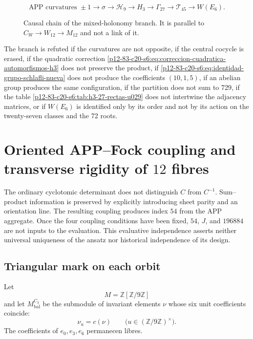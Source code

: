\begin{figure}[htbp]
\centering
\[
 \text{APP curvatures }\pm1
 \longrightarrow\sigma
 \longrightarrow\mathcal H_9
 \longrightarrow H_3
 \longrightarrow\Gamma_{27}
 \longrightarrow\mathcal T_{45}
 \longrightarrow W(E_6).
\]
\caption{Causal chain of the mixed-holonomy branch. It is parallel to
\(C_W\to W_{12}\to M_{12}\) and not a link of it.}
\label{p12-83-c20-s6:fig:cadena-holonomia-e6-u029}
\end{figure}

\begin{criterion}
\label{p12-83-c20-s6:crit:refutacion-rama-e6-u029}
The branch is refuted if the curvatures are not opposite, if the central cocycle is erased, if the quadratic correction \eqref{p12-83-c20-s6:eq:correccion-cuadratica-automorfismos-h3} does not preserve the product, if \eqref{p12-83-c20-s6:eq:identidad-grupo-schlafli-nueva} does not produce the coefficients \((10,1,5)\), if an abelian group produces the same configuration, if the partition does not sum to 729, if the table \ref{p12-83-c20-s6:tab:h3-27-rectas-u029} does not intertwine the adjacency matrices, or if \(W(E_6)\) is identified only by its order and not by its action on the twenty-seven classes and the 72 roots.
\end{criterion}


\section{Oriented APP–Fock coupling and transverse rigidity of \(12\) fibres}
\label{p12-83-c20-s7:chap:acoplamiento-app-fock}

The ordinary cyclotomic determinant does not distinguish \(C\) from \(C^{-1}\).
Sum--product information is preserved by explicitly introducing
sheet parity and an orientation line. The resulting coupling
produces index \(54\) from the APP aggregate. Once the four
coupling conditions have been fixed, \(54\), \(J\), and \(196884\) are not inputs to
the evaluation. This evaluative independence asserts neither universal uniqueness
of the ansatz nor historical independence of its design.

\subsection{Triangular mark on each orbit}

Let
\[
M=\mathbb Z[\mathbb Z/9\mathbb Z]
\]
and let \(M_{\mathrm{bal}}^{C_3}\) be the submodule of invariant elements
\(\nu\) whose six unit coefficients coincide:
\[
\nu_u=c(\nu)
\qquad
\bigl(u\in(\mathbb Z/9\mathbb Z)^\times\bigr).
\]
The coefficients of \(e_0,e_3,e_6\) permanecen libres.

